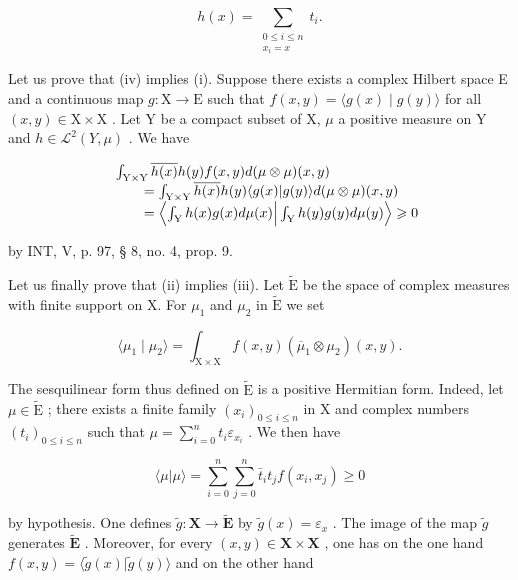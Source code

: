 \[
h(x) = \sum_{\substack{0\leqslant i\leqslant n\\ x_{i} = x}}t_{i}.
\]

Let us prove that (iv) implies (i). Suppose there exists a complex Hilbert space E and a continuous map \(g \colon \mathrm{X} \to \mathrm{E}\) such that \(f(x, y) = \langle g(x) \mid g(y) \rangle\) for all \((x, y) \in \mathrm{X} \times \mathrm{X}\) . Let Y be a compact subset of X, \(\mu\) a positive measure on Y and \(h \in \mathcal{L}^{2}(Y, \mu)\) . We have

\[
\begin{array}{r l} & {\int_ {\mathrm{Y} \times \mathrm{Y}} \overline {{h (x)}} h (y) f (x, y) d (\mu \otimes \mu) (x, y)} \\ & {\qquad = \int_ {\mathrm{Y} \times \mathrm{Y}} \overline {{h (x)}} h (y) \langle g (x) | g (y) \rangle d (\mu \otimes \mu) (x, y)} \\ & {\qquad = \left\langle \int_ {\mathrm{Y}} h (x) g (x) d \mu (x) \Big | \int_ {\mathrm{Y}} h (y) g (y) d \mu (y) \right\rangle \geqslant 0} \end{array}
\]

by INT, V, p. 97, § 8, no. 4, prop. 9.

Let us finally prove that (ii) implies (iii). Let \(\widetilde{\mathrm{E}}\) be the space of complex measures with finite support on X. For \(\mu_{1}\) and \(\mu_{2}\) in \(\widetilde{\mathrm{E}}\) we set

\[
\langle \mu_ {1} \mid \mu_ {2} \rangle = \int_ {\mathrm{X} \times \mathrm{X}} f (x, y) (\overline {{\mu}} _ {1} \otimes \mu_ {2}) (x, y).
\]

The sesquilinear form thus defined on \(\widetilde{\mathrm{E}}\) is a positive Hermitian form. Indeed, let \(\mu \in \widetilde{\mathrm{E}}\) ; there exists a finite family \((x_{i})_{0\leqslant i\leqslant n}\) in X and complex numbers \((t_i)_{0\leqslant i\leqslant n}\) such that \(\mu = \sum_{i=0}^{n} t_i \varepsilon_{x_i}\) . We then have

\[
\langle \mu | \mu \rangle = \sum_ {i = 0} ^ {n} \sum_ {j = 0} ^ {n} \bar {t} _ {i} t _ {j} f (x _ {i}, x _ {j}) \geqslant 0
\]

by hypothesis. One defines \(\widetilde{g}\colon\mathbf{X}\to\widetilde{\mathbf{E}}\) by \(\widetilde{g}(x)=\varepsilon_{x}\) . The image of the map \(\widetilde{g}\) generates \(\widetilde{\mathbf{E}}\) . Moreover, for every \((x,y)\in\mathbf{X}\times\mathbf{X}\) , one has on the one hand \(f(x,y)=\langle\widetilde{g}(x)|\widetilde{g}(y)\rangle\) and on the other hand

